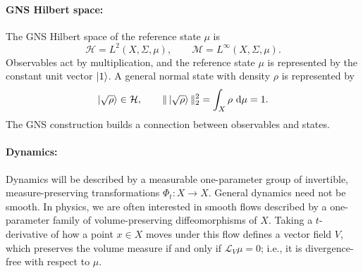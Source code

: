 \documentclass[a4paper,11pt]{article}
\theoremstyle{definition}
\newcommand{\E}{\mathbb{E}}
\newcommand{\dd}{\,\mathrm{d}}
\newcommand{\cH}{\mathcal{H}}
\newcommand{\mH}{\mathcal{H}}
\begin{document}
\paragraph{GNS Hilbert space:} The GNS Hilbert space of the reference state $\mu$ is
\[
  \cH=L^2(X,\Sigma,\mu),
  \qquad
  \mathcal M=L^\infty(X,\Sigma,\mu).
\]
Observables act by multiplication, and the reference state $\mu$ is represented by the constant unit vector $\ket{1}$. A general normal state with density $\rho$ is represented by
\[
  \ket{\sqrt{\rho}}\in\cH,
  \qquad
  \|\ket{\sqrt{\rho}}\|_2^2=\int_X\rho\,\dd\mu=1.
\]
The GNS construction builds a connection between observables and states.


\paragraph{Dynamics:} Dynamics will be described by a measurable one-parameter group of invertible, measure-preserving transformations $\Phi_t:X\to X$. General dynamics need not be smooth. In physics, we are often interested in smooth flows described by a one-parameter family of volume-preserving diffeomorphisms of $X$. Taking a $t$-derivative of how a point $x\in X$ moves under this flow defines a vector field $V$, which preserves the volume measure if and only if $\mathcal{L}_V\mu=0$; i.e., it is divergence-free with respect to $\mu$. 




\end{document}
